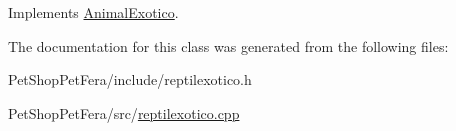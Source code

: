 Implements \mbox{\hyperlink{class_animal_exotico_a496013ecefb3cafb33537bb4022728e2}{Animal\+Exotico}}.



The documentation for this class was generated from the following files\+:\begin{DoxyCompactItemize}
\item 
Pet\+Shop\+Pet\+Fera/include/reptilexotico.\+h\item 
Pet\+Shop\+Pet\+Fera/src/\mbox{\hyperlink{reptilexotico_8cpp}{reptilexotico.\+cpp}}\end{DoxyCompactItemize}
